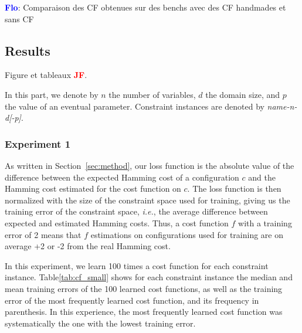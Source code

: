 \documentclass{article}
\newcommand{\ie}{\textit{i.e.}}
\newcommand{\flo}{\textcolor{blue}{\bf Flo}\xspace}
\newcommand{\jf}{\textcolor{red}{\bf JF}\xspace}
\begin{document}
\flo: Comparaison des  CF obtenues sur des  benchs avec des CF  handmades et
sans CF

\subsection{Results}
Figure et tableaux \jf.

In this part, we denote by $n$ the number of variables, $d$ the domain size, and $p$  the value of an eventual parameter. Constraint instances are denoted by \textit{name-n-d[-p]}.

\subsubsection{Experiment 1}


As written in  Section~\ref{sec:method}, our loss function is the absolute value of the difference between the expected Hamming cost of a  configuration $c$  and the  Hamming cost estimated for the cost function on $c$. The loss function is then normalized with the size of the constraint space used for training, giving us the training error of the constraint space, \ie,  the average difference between expected and estimated  Hamming costs.   Thus,  a  cost function $f$  with a training error of 2  means that  $f$ estimations on configurations used for training are on average +2 or -2 from the real Hamming cost.


In  this experiment,  we  learn 100  times a  cost  function for  each
constraint instance. Table\ref{tab:cf_small} shows for each constraint
instance the median  and mean training errors of the  100 learned cost
functions,  as well  as  the  training error  of  the most  frequently
learned  cost function,  and  its frequency  in  parenthesis. In  this
experience,   the   most   frequently  learned   cost   function   was
systematically the one with the lowest training error.
\end{document}
